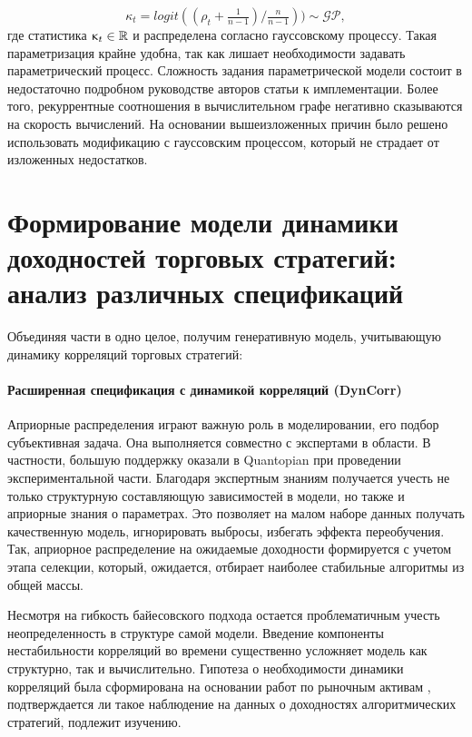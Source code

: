 \begin{equation}
	\kappa_t = logit((\rho_t + \tfrac{1}{n-1} )/\tfrac{n}{n-1}))  \sim \mathcal{GP},
\end{equation}
где статистика $\upkappa_t \in \mathbb{R}$ и распределена согласно гауссовскому процессу. Такая параметризация крайне удобна, так как лишает необходимости задавать параметрический процесс. Сложность задания параметрической модели состоит в недостаточно подробном руководстве авторов статьи к имплементации. Более того, рекуррентные соотношения в вычислительном графе негативно сказываются на скорость вычислений. На основании вышеизложенных причин было решено использовать модификацию с гауссовским процессом, который не страдает от изложенных недостатков.

\section{Формирование модели динамики доходностей торговых стратегий: анализ различных спецификаций}
Объединяя части в одно целое, получим генеративную модель, учитывающую динамику корреляций торговых стратегий:
\paragraph{Расширенная спецификация с динамикой корреляций (DynCorr)}



Априорные распределения играют важную роль в моделировании, его подбор субъективная задача. Она выполняется совместно с экспертами в области. В частности, большую поддержку оказали в Quantopian при проведении экспериментальной части. Благодаря экспертным знаниям получается учесть не только структурную составляющую зависимостей в модели, но также и априорные знания о параметрах. Это позволяет на малом наборе данных получать качественную модель, игнорировать выбросы, избегать эффекта переобучения. Так, априорное распределение на ожидаемые доходности формируется с учетом этапа селекции, который, ожидается, отбирает наиболее стабильные алгоритмы из общей массы.

Несмотря на гибкость байесовского подхода остается проблематичным учесть неопределенность в структуре самой модели. Введение компоненты нестабильности корреляций во времени существенно усложняет модель как структурно, так и вычислительно. Гипотеза о необходимости динамики корреляций была сформирована на основании работ по рыночным активам \citep{vaga1990, oral2017}, подтверждается ли такое наблюдение на данных о доходностях алгоритмических стратегий, подлежит изучению.

